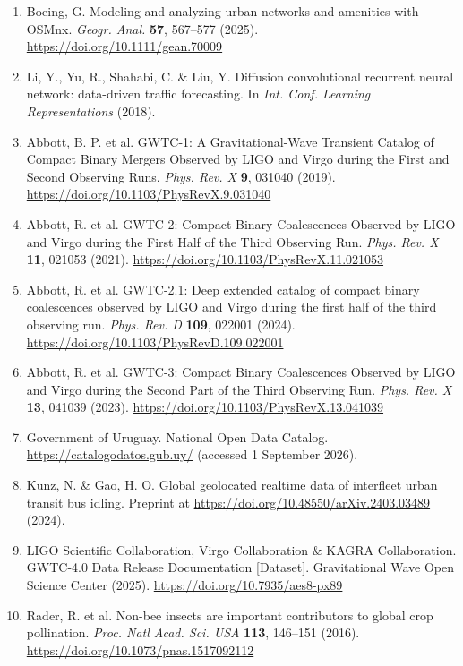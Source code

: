 \documentclass{article}
\begin{document}
\begin{enumerate}[label=S\arabic*.,ref=S\arabic*,leftmargin=2.8em,itemsep=0.6em]
\item \label{src:S22} Boeing, G. Modeling and analyzing urban networks and amenities with OSMnx. \textit{Geogr. Anal.} \textbf{57}, 567--577 (2025). \url{https://doi.org/10.1111/gean.70009}
\item \label{src:S23} Li, Y., Yu, R., Shahabi, C. \& Liu, Y. Diffusion convolutional recurrent neural network: data-driven traffic forecasting. In \textit{Int. Conf. Learning Representations} (2018).
\item \label{src:S24} Abbott, B. P. et al. GWTC-1: A Gravitational-Wave Transient Catalog of Compact Binary Mergers Observed by LIGO and Virgo during the First and Second Observing Runs. \textit{Phys. Rev. X} \textbf{9}, 031040 (2019). \url{https://doi.org/10.1103/PhysRevX.9.031040}
\item \label{src:S25} Abbott, R. et al. GWTC-2: Compact Binary Coalescences Observed by LIGO and Virgo during the First Half of the Third Observing Run. \textit{Phys. Rev. X} \textbf{11}, 021053 (2021). \url{https://doi.org/10.1103/PhysRevX.11.021053}
\item \label{src:S26} Abbott, R. et al. GWTC-2.1: Deep extended catalog of compact binary coalescences observed by LIGO and Virgo during the first half of the third observing run. \textit{Phys. Rev. D} \textbf{109}, 022001 (2024). \url{https://doi.org/10.1103/PhysRevD.109.022001}
\item \label{src:S27} Abbott, R. et al. GWTC-3: Compact Binary Coalescences Observed by LIGO and Virgo during the Second Part of the Third Observing Run. \textit{Phys. Rev. X} \textbf{13}, 041039 (2023). \url{https://doi.org/10.1103/PhysRevX.13.041039}
\item \label{src:S28} Government of Uruguay. National Open Data Catalog. \url{https://catalogodatos.gub.uy/} (accessed 1 September 2026).
\item \label{src:S29} Kunz, N. \& Gao, H. O. Global geolocated realtime data of interfleet urban transit bus idling. Preprint at \url{https://doi.org/10.48550/arXiv.2403.03489} (2024).
\item \label{src:S30} LIGO Scientific Collaboration, Virgo Collaboration \& KAGRA Collaboration. GWTC-4.0 Data Release Documentation [Dataset]. Gravitational Wave Open Science Center (2025). \url{https://doi.org/10.7935/aes8-px89}
\item \label{src:S31} Rader, R. et al. Non-bee insects are important contributors to global crop pollination. \textit{Proc. Natl Acad. Sci. USA} \textbf{113}, 146--151 (2016). \url{https://doi.org/10.1073/pnas.1517092112}
\end{enumerate}

\endgroup
\end{document}
